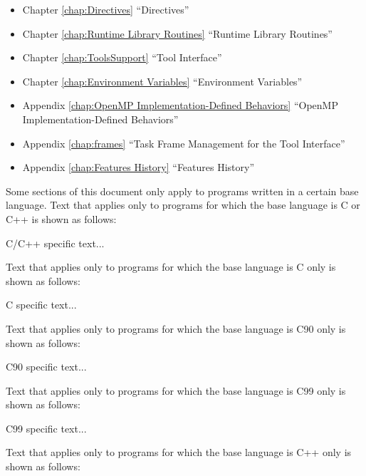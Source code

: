 \begin{itemize}
\item Chapter \ref{chap:Directives} ``Directives''

\item Chapter \ref{chap:Runtime Library Routines} ``Runtime Library Routines''

\item Chapter \ref{chap:ToolsSupport} ``Tool Interface''

\item Chapter \ref{chap:Environment Variables} ``Environment Variables''

\item Appendix \ref{chap:OpenMP Implementation-Defined Behaviors} ``OpenMP Implementation-Defined Behaviors''

\item Appendix \ref{chap:frames} ``Task Frame Management for the Tool Interface''

\item Appendix \ref{chap:Features History} ``Features History''
\end{itemize}

Some sections of this document only apply to programs written in a certain base
language. Text that applies only to programs for which the base language is C or C++ is shown
as follows:

\begin{ccppspecific}
C/C++ specific text...
\end{ccppspecific}

Text that applies only to programs for which the base language is C only is shown as follows:

\begin{cspecific}
C specific text...
\end{cspecific}

Text that applies only to programs for which the base language is C90 only is shown as
follows:

\begin{c90specific}
C90 specific text...
\end{c90specific}

Text that applies only to programs for which the base language is C99 only is shown as
follows:

\begin{c99specific}
C99 specific text...
\end{c99specific}

Text that applies only to programs for which the base language is C++ only is shown as
follows:

